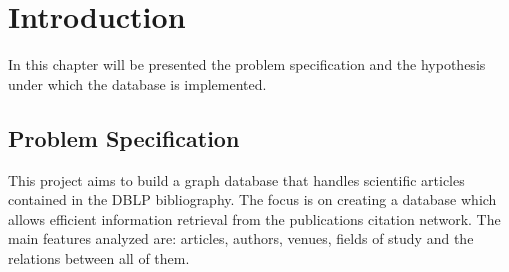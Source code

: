 \documentclass{Configuration_Files/PoliMi3i_thesis}
\begin{document}


\pagestyle{empty} %
\frontmatter %


\startpreamble
\setcounter{page}{1} %


\thispagestyle{empty}
\tableofcontents %
\thispagestyle{empty}
\cleardoublepage

\mainmatter %

\chapter{Introduction}
\label{ch:introduction}%

In this chapter will be presented the problem specification and the hypothesis under which the database is implemented.

\section{Problem Specification}
\label{sec:prob_specs}
This project aims to build a graph database that handles scientific articles contained in the DBLP bibliography.
The focus is on creating a database which allows efficient information retrieval from the publications citation network.
The main features analyzed are: articles, authors, venues, fields of study and the relations between all of them.
\end{document}
